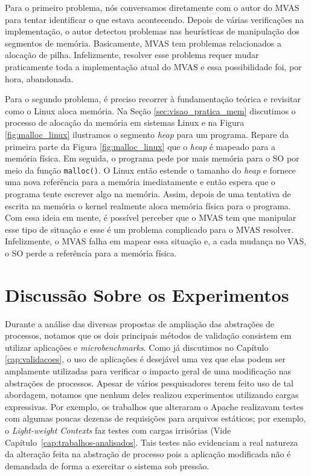 Para o primeiro problema, nós conversamos diretamente com o autor do MVAS para
tentar identificar o que estava acontecendo. Depois de várias verificações na implementação,
o autor detectou problemas nas heurísticas de manipulação dos segmentos de
memória.  Basicamente, MVAS tem problemas relacionados a alocação de
pilha. Infelizmente, resolver esse problema requer mudar praticamente
toda a implementação atual do MVAS e essa possibilidade foi, por hora, abandonada.

Para o segundo problema, é preciso recorrer à fundamentação teórica e revisitar
como o Linux aloca memória. Na Seção \ref{sec:visao_pratica_mem} discutimos o
processo de alocação da memória em sistemas Linux e na Figura
\ref{fig:malloc_linux} ilustramos o segmento \emph{heap} para um programa.
Repare da primeira parte da Figura \ref{fig:malloc_linux} que o \emph{heap} é
mapeado para a memória física. Em seguida, o programa pede por mais memória
para o SO por meio da função \texttt{malloc()}. O Linux então estende o tamanho
do \emph{heap} e fornece uma nova referência para a memória imediatamente e
então espera que o programa tente escrever algo na memória.  Assim, depois de
uma tentativa de escrita na memória o kernel realmente aloca memória física
para o programa. Com essa ideia em mente, é possível perceber que o MVAS tem
que manipular esse tipo de situação e esse é um problema complicado para o MVAS
resolver. Infelizmente, o MVAS falha em mapear essa situação e, a cada mudança no
VAS, o SO perde a referência para a memória física.

\section{Discussão Sobre os Experimentos}

Durante a análise das diversas propostas de ampliação das abstrações de
processos, notamos que os dois principais métodos de validação consistem em
utilizar aplicações e \textit{microbenchmarks}. Como já discutimos no Capítulo
\ref{cap:validacoes}, o uso de aplicações é desejável uma vez que elas podem
ser amplamente utilizadas para verificar o impacto geral de uma modificação nas
abstrações de processos. Apesar de vários pesquisadores terem feito uso de tal
abordagem, notamos que nenhum deles realizou experimentos utilizando cargas
expressivas. Por exemplo, os trabalhos que alteraram o Apache realizavam testes
com algumas poucas dezenas de requisições para arquivos estáticos; por exemplo,
o \emph{Light-weight Contexts} faz testes com cargas irrisórias (Vide
Capítulo~\ref{cap:trabalhos-analisados}. Tais testes não evidenciam a real
natureza da alteração feita na abstração de processo pois a aplicação
modificada não é demandada de forma a exercitar o sistema sob pressão.


